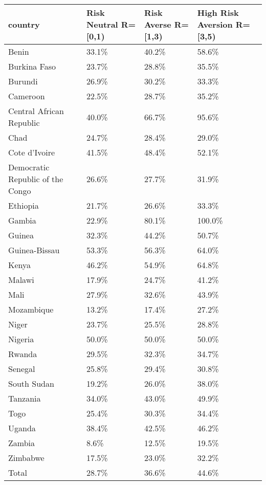 \begin{table}[ht]
\centering
\begin{tabular}{llll}
  \hline
country & Risk Neutral R=[0,1) & Risk Averse R=[1,3) & High Risk Aversion R=[3,5) \\ 
  \hline
Benin & 33.1\% & 40.2\% & 58.6\% \\ 
  Burkina Faso & 23.7\% & 28.8\% & 35.5\% \\ 
  Burundi & 26.9\% & 30.2\% & 33.3\% \\ 
  Cameroon & 22.5\% & 28.7\% & 35.2\% \\ 
  Central African Republic & 40.0\% & 66.7\% & 95.6\% \\ 
  Chad & 24.7\% & 28.4\% & 29.0\% \\ 
  Cote d'Ivoire & 41.5\% & 48.4\% & 52.1\% \\ 
  Democratic Republic of the Congo & 26.6\% & 27.7\% & 31.9\% \\ 
  Ethiopia & 21.7\% & 26.6\% & 33.3\% \\ 
  Gambia & 22.9\% & 80.1\% & 100.0\% \\ 
  Guinea & 32.3\% & 44.2\% & 50.7\% \\ 
  Guinea-Bissau & 53.3\% & 56.3\% & 64.0\% \\ 
  Kenya & 46.2\% & 54.9\% & 64.8\% \\ 
  Malawi & 17.9\% & 24.7\% & 41.2\% \\ 
  Mali & 27.9\% & 32.6\% & 43.9\% \\ 
  Mozambique & 13.2\% & 17.4\% & 27.2\% \\ 
  Niger & 23.7\% & 25.5\% & 28.8\% \\ 
  Nigeria & 50.0\% & 50.0\% & 50.0\% \\ 
  Rwanda & 29.5\% & 32.3\% & 34.7\% \\ 
  Senegal & 25.8\% & 29.4\% & 30.8\% \\ 
  South Sudan & 19.2\% & 26.0\% & 38.0\% \\ 
  Tanzania & 34.0\% & 43.0\% & 49.9\% \\ 
  Togo & 25.4\% & 30.3\% & 34.4\% \\ 
  Uganda & 38.4\% & 42.5\% & 46.2\% \\ 
  Zambia & 8.6\% & 12.5\% & 19.5\% \\ 
  Zimbabwe & 17.5\% & 23.0\% & 32.2\% \\ 
  Total & 28.7\% & 36.6\% & 44.6\% \\ 
   \hline
\end{tabular}
\end{table}
